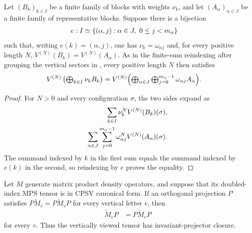 \begin{lemma}
    \label{lem:vertical_grouping_equiv}
    \leanok
    Let $(B_k)_{k\in I}$ be a finite family of blocks with weights $\nu_k$,
    and let $(A_\alpha)_{\alpha\in J}$ be a finite family of representative
    blocks. Suppose there is a bijection
    \begin{align}
        e:I & \simeq\{(\alpha,j):\alpha\in J,\ 0\leq j<m_\alpha\}
        \notag
    \end{align}
    such that, writing $e(k)=(\alpha,j)$, one has
    $\nu_k=\omega_{\alpha j}$ and, for every positive length $N$,
    $V^{(N)}(B_k)=V^{(N)}(A_\alpha)$. As in the finite-sum reindexing after
    grouping the vertical sectors in
    \cite[Proposition~4.13]{Cirac2016MPDO_arXiv}, every positive length $N$
    then satisfies
    \begin{align}
        V^{(N)}\left(\textstyle\bigoplus_{k\in I}\nu_kB_k\right)
         & =
        V^{(N)}\Bigl(      \textstyle\bigoplus_{\alpha\in J}
        \bigoplus_{j=0}^{m_\alpha-1}\omega_{\alpha j}A_\alpha
        \Bigr).
        \notag
    \end{align}
\end{lemma}
\begin{proof}\leanok
    For $N>0$ and every configuration $\sigma$, the two sides expand as
    \begin{align}
        \sum_{k\in I}\nu_k^NV^{(N)}(B_k)(\sigma),
        \notag \\
        \sum_{\alpha\in J}\sum_{j=0}^{m_\alpha-1}
        \omega_{\alpha j}^NV^{(N)}(A_\alpha)(\sigma).
        \notag
    \end{align}
    The summand indexed by $k$ in the first sum equals the summand indexed by
    $e(k)$ in the second, so reindexing by $e$ proves the equality.
\end{proof}

\begin{lemma}
    \label{thm:mpdo_vertical_projector_closure_literal_cpsv}
    \leanok
    Let $M$ generate matrix product density operators, and suppose that its
    doubled-index MPS tensor is in CPSV canonical form. If an
    orthogonal projection $P$ satisfies
    $P\widetilde M_v=P\widetilde M_vP$ for every vertical letter $v$, then
    \begin{align}
        \widetilde M_vP & =P\widetilde M_vP
        \label{eq:cpsv_literal_vertical_projector_closure}
    \end{align}
    for every $v$. Thus the vertically viewed tensor has
    invariant-projector closure.
\end{lemma}

